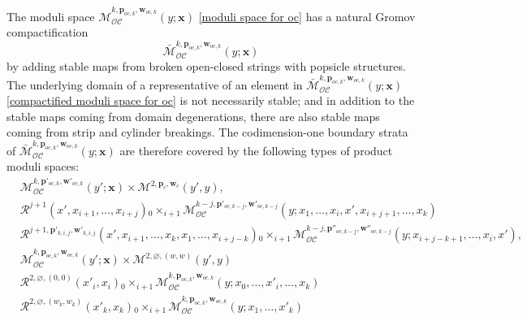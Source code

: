 \documentclass[11pt]{amsproc}
\def\cR{\mathcal{R}}
\def\oc{\mathcal{OC}}
\def\M{\mathcal{M}}
\theoremstyle{remark}
\numberwithin{equation}{section}
\begin{document}
The moduli space $\M_{\oc}^{k, \mathbf{p}_{oc, k}, \mathbf{w}_{oc, k}}(y; \mathbf{x})$ \eqref{moduli space for oc} has a natural Gromov compactification
\begin{equation}\label{compactified moduli space for oc}
\bar{\M}_{\oc}^{k, \mathbf{p}_{oc, k}, \mathbf{w}_{oc, k}}(y; \mathbf{x})
\end{equation}
by adding stable maps from broken open-closed strings with popsicle structures.
The underlying domain of a representative of an element in $\bar{\M}_{\oc}^{k, \mathbf{p}_{oc, k}, \mathbf{w}_{oc, k}}(y; \mathbf{x})$ \eqref{compactified moduli space for oc} is not necessarily stable;
and in addition to the stable maps coming from domain degenerations,
there are also stable maps coming from strip and cylinder breakings.
The codimension-one boundary strata of $\bar{\M}_{\oc}^{k, \mathbf{p}_{oc, k}, \mathbf{w}_{oc, k}}(y; \mathbf{x})$ are therefore covered by the following types of product moduli spaces:
\begin{align}
& \M_{\oc}^{k, \mathbf{p}'_{oc, k}, \mathbf{w}'_{oc, k}}(y'; \mathbf{x}) \times \M^{2, \mathbf{p}_{c}, \mathbf{w}_{c}}(y', y), \label{oc boundary 1} \\ 
& \cR^{j+1}(x', x_{i+1}, \ldots, x_{i+j}) {}_{0}\times_{i+1} \M_{\oc}^{k-j, \mathbf{p}'_{oc, k-j}, \mathbf{w}'_{oc, k-j}}(y; x_{1}, \ldots, x_{i}, x', x_{i+j+1}, \ldots, x_{k})  \label{oc boundary 2}\\ 
& \cR^{j+1, \mathbf{p}'_{k, i, j}, \mathbf{w}'_{k, i, j}}(x', x_{i+1}, \dots, x_{k}, x_{1}, \ldots, x_{i+j-k}) {}_{0}\times_{i+1} \M_{\oc}^{k-j, \mathbf{p}''_{oc, k-j}, \mathbf{w}''_{oc, k-j}}(y; x_{i+j-k+1}, \ldots, x_{i}, x'), \label{oc boundary 3}\\
& \M_{\oc}^{k, \mathbf{p}_{oc, k}, \mathbf{w}_{oc, k}}(y'; \mathbf{x}) \times \M^{2, \varnothing, (w, w)}(y', y) \label{oc boundary 4} \\
& \cR^{2, \varnothing, (0, 0)}(x'_{i}, x_{i})  {}_{0}\times_{i+1} \M_{\oc}^{k, \mathbf{p}_{oc, k}, \mathbf{w}_{oc, k}}(y; x_{0}, \ldots, x'_{i}, \ldots, x_{k})  \label{oc boundary 5}\\
& \cR^{2, \varnothing, (w_{k}, w_{k})}(x'_{k}, x_{k})  {}_{0}\times_{i+1} \M_{\oc}^{k, \mathbf{p}_{oc, k}, \mathbf{w}_{oc, k}}(y; x_{1}, \ldots, x'_{k}) \label{oc boundary 6}\\
\end{align}
\end{document}
